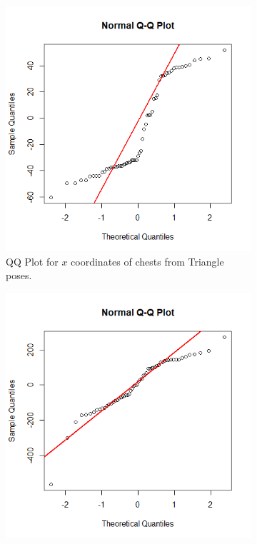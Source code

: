 \documentclass{article}
\begin{document}
\begin{figure}[h!]
\begin{subfigure}[b]{0.4\linewidth}
        \includegraphics[width=\linewidth]{limb-distribution/triangle_qq_chest_x.png}
        \caption{QQ Plot for $x$ coordinates of chests from Triangle poses.}
        \label{fig: tri chest}
    \end{subfigure}
    \begin{subfigure}[b]{0.4\linewidth}
        \includegraphics[width=\linewidth]{limb-distribution/bridge_qq_head_x.png}

\end{subfigure}
\end{figure}
\end{document}
